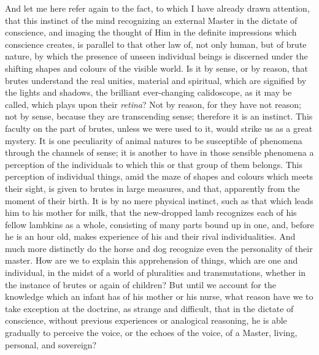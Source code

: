 And let me here refer again to the fact, to which I have already
drawn attention, that this instinct of the mind recognizing an
external Master in the dictate of conscience, and imaging the thought
of Him in the definite impressions which conscience creates, is
parallel to that other law of, not only human, but of brute nature, by
which the presence of unseen individual beings is discerned under the
shifting shapes and colours of the visible world. Is it by sense, or
by reason, that brutes understand the real unities, material and
spiritual, which are signified by the lights and shadows, the
brilliant ever-changing calidoscope, as it may be called, which plays
upon their \emph{retina}? Not by reason, for they have not reason; not
by sense, because they are transcending sense; therefore it is an
instinct. This faculty on the part of brutes, unless we were used to
it, would strike us as a great mystery. It is one peculiarity of
animal natures to be susceptible of phenomena through the channels of
sense; it is another to have in those sensible phenomena a perception
of the individuals to which this or that group of them belongs. This
perception of individual things, amid the maze of shapes and colours
which meets their sight, is given to brutes in large measures, and
that, apparently from the moment of their birth. It is by no mere
physical instinct, such as that which leads him to his mother for
milk, that the new-dropped lamb recognizes each of his fellow lambkins
as a whole, consisting of many parts bound up in one, and, before he
is an hour old, makes experience of his and their rival
individualities. And much more distinctly do the horse and dog
recognize even the personality of their master. How are we to explain
this apprehension of things, which are one and individual, in the
midst of a world of pluralities and transmutations, whether in the
instance of brutes or again of children? But until we account for the
knowledge which an infant has of his mother or his nurse, what reason
have we to take exception at the doctrine, as strange and difficult,
that in the dictate of conscience, without previous experiences
or analogical reasoning, he is able gradually to perceive the voice,
or the echoes of the voice, of a Master, living, personal, and
sovereign?

